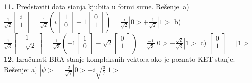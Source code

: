 \documentclass{article}
\begin{document}
\vspace*{0.4cm}\newline
\textbf{11.} Predstaviti data stanja kjubita u formi sume.
\vspace*{0.4cm}\newline
Rešenje: \newline
a) $\frac{1}{\sqrt{2}}\begin{bmatrix}
    i\\
    1\\
\end{bmatrix} = \frac{1}{\sqrt{2}}(i\begin{bmatrix}
    1\\
    0\\
\end{bmatrix} + 1\begin{bmatrix}
    0\\
    1\\
\end{bmatrix}) = \frac{i}{\sqrt{2}}|0> + \frac{1}{\sqrt{2}}|1>$
\vspace{0.3cm} \newline
b) $\frac{1}{\sqrt{3}}\begin{bmatrix}
    -1\\
    -\sqrt{2}\\
\end{bmatrix} = \frac{1}{\sqrt{3}}(-1\begin{bmatrix}
    1\\
    0\\
\end{bmatrix} - \sqrt{2}\begin{bmatrix}
    0\\
    1\\
\end{bmatrix}) = \frac{-1}{\sqrt{3}}|0> - \frac{\sqrt{2}}{\sqrt{3}}|1>$
\vspace{0.3cm} \newline
c) $\begin{bmatrix}
    0\\
    1\\
\end{bmatrix} = |1>$
\vspace*{0.4cm}\newline
\textbf{12.} Izračunati BRA stanje kompleksnih vektora ako je poznato KET stanje.
\vspace*{0.4cm}\newline
Rešenje: \newline
a) $|\psi> = \frac{2}{\sqrt{7}}|0> + i\sqrt{\frac{3}{7}}|1>$
\end{document}
